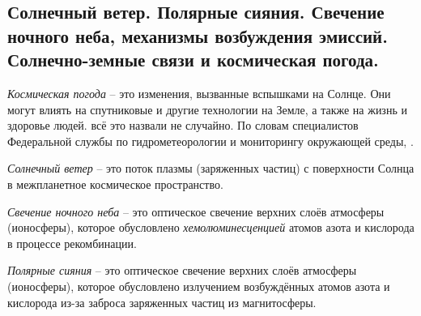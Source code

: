 \subsection{Солнечный ветер. Полярные сияния. Свечение ночного неба, механизмы возбуждения эмиссий. Солнечно-земные связи и космическая погода.}
\textit{Космическая погода} -- это изменения, вызванные вспышками на Солнце.
Они могут влиять на спутниковые и другие технологии на Земле, а также на жизнь и здоровье людей.
 всё это назвали не случайно.
По словам специалистов Федеральной службы по гидрометеорологии и мониторингу окружающей среды, .

\textit{Солнечный ветер} -- это поток плазмы (заряженных частиц) с поверхности Солнца в межпланетное космическое пространство.

\textit{Свечение ночного неба} -- это оптическое свечение верхних слоёв атмосферы (ионосферы), которое обусловлено \textit{хемолюминесценцией} атомов азота и кислорода в процессе рекомбинации.

\textit{Полярные сияния} -- это оптическое свечение верхних слоёв атмосферы (ионосферы), которое обусловлено излучением возбуждённых атомов азота и кислорода из-за заброса заряженных частиц из магнитосферы.
